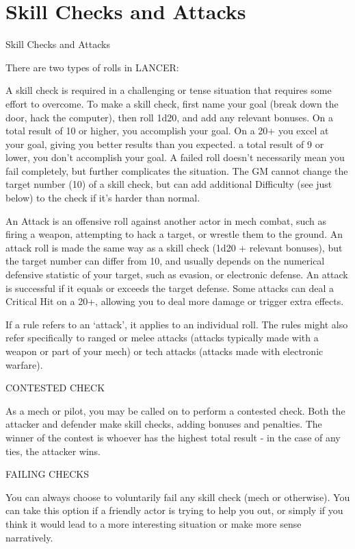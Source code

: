\section{Skill Checks and Attacks}
   Skill Checks and Attacks  

There are two types of rolls in LANCER:
 

A skill check is required in a challenging or tense situation that requires some effort to  
overcome. To make a skill check, first name your goal (break down the door, hack the computer),  
then roll 1d20, and add any relevant bonuses. On a total result of 10 or higher, you accomplish  
your goal. On a 20+ you excel at your goal, giving you better results than you expected. a total  
result of 9 or lower, you don’t accomplish your goal. A failed roll doesn’t necessarily mean you  
fail completely, but further complicates the situation. The GM cannot change the target number  
(10) of a skill check, but can add additional Difficulty (see just below) to the check if it’s harder  
than normal.
 

                                                                                                                 


An Attack is an offensive roll against another actor in mech combat, such as firing a weapon,  
attempting to hack a target, or wrestle them to the ground. An attack roll is made the same way  
as a skill check (1d20 + relevant bonuses), but the target number can differ from 10, and usually  
depends on the numerical defensive statistic of your target, such as evasion, or electronic  
defense. An attack is successful if it equals or exceeds the target defense. Some attacks can  
deal a Critical Hit on a 20+, allowing you to deal more damage or trigger extra effects.
 

If a rule refers to an ‘attack’, it applies to an individual roll. The rules might also refer specifically  
to ranged or melee attacks (attacks typically made with a weapon or part of your mech) or tech  
attacks (attacks made with electronic warfare). 
 

                                           CONTESTED CHECK  

As a mech or pilot, you may be called on to perform a contested check. Both the attacker and  
defender make skill checks, adding bonuses and penalties. The winner of the contest is whoever  
has the highest total result - in the case of any ties, the attacker wins.
 

                                             FAILING CHECKS  

You can always choose to voluntarily fail any skill check (mech or otherwise). You can take this  
option if a friendly actor is trying to help you out, or simply if you think it would lead to a more  
interesting situation or make more sense narratively.
 